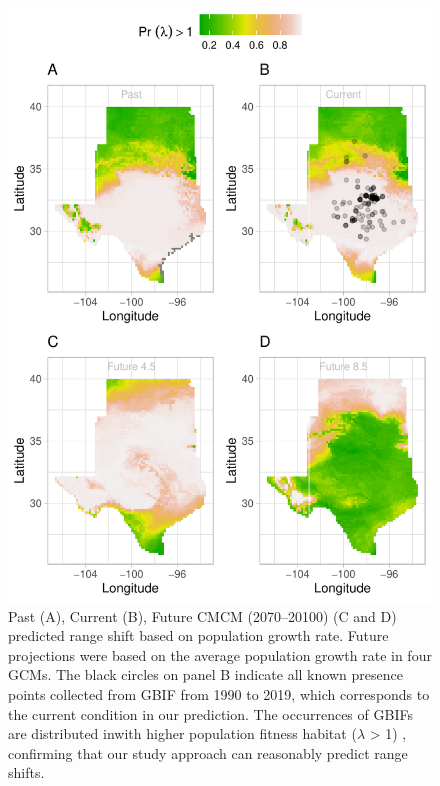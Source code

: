 \documentclass[12pt]{article}
\begin{document}
\begin{figure}[H]
  \begin{center}
    \includegraphics[width=0.78\linewidth]{Figures/Fig_geoPrlambdaprojectioncmc.pdf}
  \caption{Past (A), Current (B), Future CMCM (2070–20100) (C and D) predicted range shift based on population growth rate. Future projections were based on the average population growth rate in four GCMs. The black circles on panel B indicate all known presence points collected from GBIF from 1990 to 2019, which corresponds to the current condition in our prediction.  The occurrences of GBIFs are distributed inwith higher population fitness habitat ($\lambda$ > 1) , confirming that our study approach can reasonably predict range shifts. }
  \label{fig:geoprojcmc}
  \end{center}
\end{figure}
\end{document}
